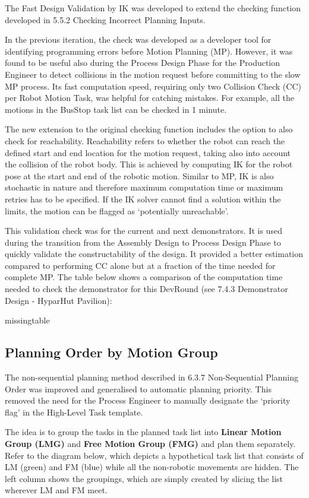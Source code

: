 The Fast Design Validation by IK was developed to extend the checking function developed in 5.5.2 Checking Incorrect Planning Inputs. 

In the previous iteration, the check was developed as a developer tool for identifying programming errors before Motion Planning (MP). However, it was found to be useful also during the Process Design Phase for the Production Engineer to detect collisions in the motion request before committing to the slow MP process. Its fast computation speed, requiring only two Collision Check (CC) per Robot Motion Task, was helpful for catching mistakes. For example, all the motions in the BusStop task list can be checked in 1 minute. 

The new extension to the original checking function includes the option to also check for reachability. Reachability refers to whether the robot can reach the defined start and end location for the motion request, taking also into account the collision of the robot body. This is achieved by computing IK for the robot pose at the start and end of the robotic motion. Similar to MP, IK is also stochastic in nature and therefore maximum computation time or maximum retries has to be specified. If the IK solver cannot find a solution within the limits, the motion can be flagged as ‘potentially unreachable’.

This validation check was for the current and next demonstrators. It is used during the transition from the Assembly Design to Process Design Phase to quickly validate the constructability of the design. It provided a better estimation compared to performing CC alone but at a fraction of the time needed for complete MP. The table below shows a comparison of the computation time needed to check the demonstrator for this DevRound (see 7.4.3 Demonstrator Design  - HyparHut Pavilion):

missingtable

\subsection{Planning Order by Motion Group}
\label{subsection:exploration_4_planning_order_by_motion_group}

The non-sequential planning method described in 6.3.7 Non-Sequential Planning Order was improved and generalised to automatic planning priority. This removed the need for the Process Engineer to manually designate the ‘priority flag’ in the High-Level Task template. 

The idea is to group the tasks in the planned task list into \textbf{Linear Motion Group (LMG)} and \textbf{Free Motion Group (FMG)} and plan them separately. Refer to the diagram below, which depicts a hypothetical task list that consists of LM (green) and FM (blue) while all the non-robotic movements are hidden. The left column shows the groupings, which are simply created by slicing the list wherever LM and FM meet. 

